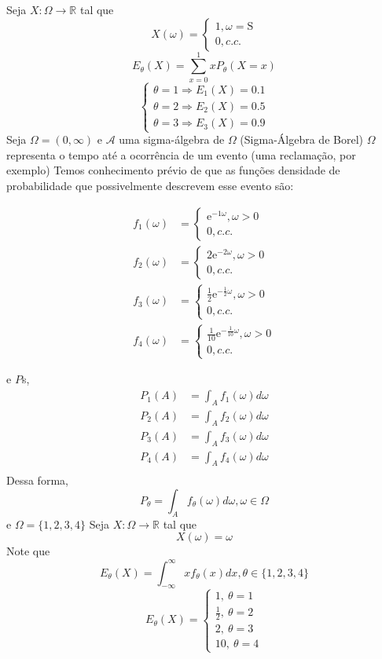 \documentclass[
  letterpaper,
  DIV=11,
  numbers=noendperiod]{scrreprt}
\begin{document}
Seja \(X : \Omega \rightarrow \mathbb{R}\) tal que
\[X(\omega)=\begin{cases}
1, \omega = \text{S} \\
0, c.c.
\end{cases}\] \[E_\theta(X)=\sum\limits^{1}_{x=0}xP_\theta(X=x)\]
\[\begin{cases}
\theta = 1 \Rightarrow E_{1}(X)=0.1 \\
\theta = 2 \Rightarrow E_{2}(X)=0.5 \\
\theta = 3 \Rightarrow E_{3}(X)=0.9
\end{cases}\] Seja \(\Omega=(0,\infty)\) e \(\mathscr{A}\) uma
sigma-álgebra de \(\Omega\) (Sigma-Álgebra de Borel) \(\Omega\)
representa o tempo até a ocorrência de um evento (uma reclamação, por
exemplo) Temos conhecimento prévio de que as funções densidade de
probabilidade que possivelmente descrevem esse evento são:

\[
\begin{aligned}
f_{1}(\omega) &=
\begin{cases}
\mathrm{e}^{-1\omega}, \omega>0 \\
0, c.c.
\end{cases}\\
f_{2} (\omega) &=
\begin{cases}
2\mathrm{e}^{-2\omega}, \omega>0 \\
0, c.c.
\end{cases}\\
f_{3} (\omega) &=
\begin{cases}
\frac{1}{2}\mathrm{e}^{-\frac{1}{2}\omega}, \omega>0 \\
0, c.c.
\end{cases}\\
f_{4} (\omega) &=
\begin{cases}
\frac{1}{10}\mathrm{e}^{- \frac{1}{10}\omega}, \omega>0 \\
0, c.c.
\end{cases}
\end{aligned}
\]

e \(P\)s, \[
\begin{aligned}
P_{1}(A)&= \int_{A} f_{1}(\omega)d \omega \\
P_{2}(A)&= \int_{A} f_{2}(\omega)d \omega \\
P_{3}(A)&= \int_{A} f_{3}(\omega)d \omega \\
P_{4}(A)&= \int_{A} f_{4}(\omega)d \omega \\
\end{aligned}\] Dessa forma,
\[P_{\theta}= \int_{A}f_\theta(\omega)d \omega, \omega \in \Omega\] e
\(\Omega = \{1,2,3,4 \}\) Seja \(X: \Omega \rightarrow \mathbb{R}\) tal
que \[X(\omega)= \omega\] Note que
\[E_\theta(X)=\int_{-\infty}^{\infty}xf_\theta(x)dx, \theta \in \{1,2,3,4 \}\]
\[E_\theta(X)=\begin{cases}
1,~ \theta=1 \\
\frac{1}{2},~ \theta=2 \\
2,~ \theta=3 \\
10,~ \theta=4
\end{cases}
\]
\end{document}
